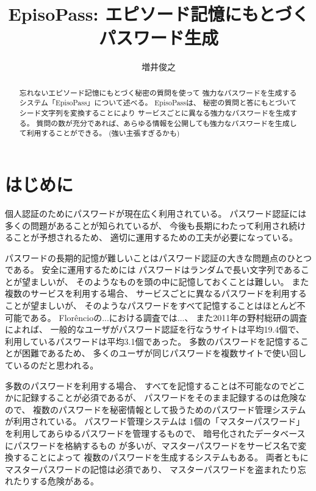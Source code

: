 \documentclass[twoside]{wiss}
\begin{document}
\title{EpisoPass: エピソード記憶にもとづくパスワード生成}

\author{増井俊之}

\begin{abstract}
忘れないエピソード記憶にもとづく秘密の質問を使って
強力なパスワードを生成するシステム「EpisoPass」について述べる。
EpisoPassは、
秘密の質問と答にもとづいてシード文字列を変換することにより
サービスごとに異なる強力なパスワードを生成する。
質問の数が充分であれば、あらゆる情報を公開しても強力なパスワードを生成して利用することができる。 (強い主張すぎるかも)
\end{abstract}

\maketitle

\section{はじめに}

個人認証のためにパスワードが現在広く利用されている。
パスワード認証には多くの問題があることが知られているが\cite{増井_ユニマガ}、
今後も長期にわたって利用され続けることが予想されるため、
適切に運用するための工夫が必要になっている。

パスワードの長期的記憶が難しいことはパスワード認証の大きな問題点のひとつである。
安全に運用するためには
パスワードはランダムで長い文字列であることが望ましいが、
そのようなものを頭の中に記憶しておくことは難しい。
また複数のサービスを利用する場合、
サービスごとに異なるパスワードを利用することが望ましいが、
そのようなパスワードをすべて記憶することはほとんど不可能である。
%
Flor\^{e}ncioの...における調査では...\cite{Florencio:2007:LSW:1242572.1242661}、
また2011年の野村総研の調査によれば、
一般的なユーザがパスワード認証を行なうサイトは平均19.4個で、
利用しているパスワードは平均3.1個であった\cite{野村総研}。
多数のパスワードを記憶することが困難であるため、
多くのユーザが同じパスワードを複数サイトで使い回しているのだと思われる。

多数のパスワードを利用する場合、
すべてを記憶することは不可能なのでどこかに記録することが必須であるが、
パスワードをそのまま記録するのは危険なので、
複数のパスワードを秘密情報として扱うためのパスワード管理システムが利用されている。
パスワード管理システムは
1個の「マスターパスワード」を利用してあらゆるパスワードを管理するもので、
暗号化されたデータベースにパスワードを格納するもの%
\cite{OnePassword}%
\cite{Dashlane}%
\cite{ミルパス}%
\cite{LastPass}%
\cite{KeyPass}%
\cite{NortonIDSafe}%
\cite{IDManager}%
が多いが、マスターパスワードをサービス名で変換することによって
複数のパスワードを生成するシステム\cite{SuperGenPass}もある。
両者ともにマスターパスワードの記憶は必須であり、
マスターパスワードを盗まれたり忘れたりする危険がある。
\end{document}

